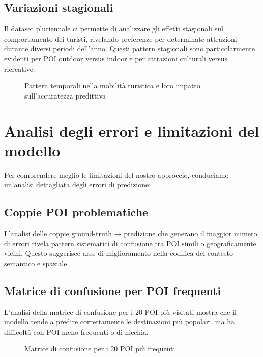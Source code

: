 \subsection{Variazioni stagionali}

Il dataset pluriennale ci permette di analizzare gli effetti stagionali sul comportamento dei turisti, rivelando preferenze per determinate attrazioni durante diversi periodi dell'anno. Questi pattern stagionali sono particolarmente evidenti per POI outdoor versus indoor e per attrazioni culturali versus ricreative.

\begin{figure}[H]
\centering
\caption{Pattern temporali nella mobilità turistica e loro impatto sull'accuratezza predittiva}
\label{fig:temporal_analysis}
\end{figure}

\section{Analisi degli errori e limitazioni del modello}

Per comprendere meglio le limitazioni del nostro approccio, conduciamo un'analisi dettagliata degli errori di predizione:

\subsection{Coppie POI problematiche}

L'analisi delle coppie ground-truth → predizione che generano il maggior numero di errori rivela pattern sistematici di confusione tra POI simili o geograficamente vicini. Questo suggerisce aree di miglioramento nella codifica del contesto semantico e spaziale.

\subsection{Matrice di confusione per POI frequenti}

L'analisi della matrice di confusione per i 20 POI più visitati mostra che il modello tende a predire correttamente le destinazioni più popolari, ma ha difficoltà con POI meno frequenti o di nicchia.

\begin{figure}[H]
\centering
\caption{Matrice di confusione per i 20 POI più frequenti}
\label{fig:confusion_matrix}
\end{figure}

